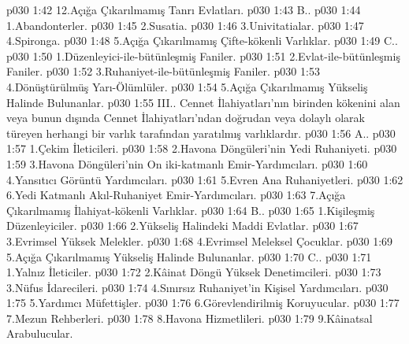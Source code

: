 \vs p030 1:42 12.\bibnobreakspace Açığa Çıkarılmamış Tanrı Evlatları.
\vs p030 1:43 B.\bibnobreakspace {}.
\vs p030 1:44 1.\bibnobreakspace Abandonterler.
\vs p030 1:45 2.\bibnobreakspace Susatia.
\vs p030 1:46 3.\bibnobreakspace Univitatialar.
\vs p030 1:47 4.\bibnobreakspace Spironga.
\vs p030 1:48 5.\bibnobreakspace Açığa Çıkarılmamış Çifte\hyp{}kökenli Varlıklar.
\vs p030 1:49 C.\bibnobreakspace {}.
\vs p030 1:50 1.\bibnobreakspace Düzenleyici\hyp{}ile\hyp{}bütünleşmiş Faniler.
\vs p030 1:51 2.\bibnobreakspace Evlat\hyp{}ile\hyp{}bütünleşmiş Faniler.
\vs p030 1:52 3.\bibnobreakspace Ruhaniyet\hyp{}ile\hyp{}bütünleşmiş Faniler.
\vs p030 1:53 4.\bibnobreakspace Dönüştürülmüş Yarı\hyp{}Ölümlüler.
\vs p030 1:54 5.\bibnobreakspace Açığa Çıkarılmamış Yükseliş Halinde Bulunanlar.
\vs p030 1:55 III.\bibnobreakspace {}. Cennet İlahiyatları’nın birinden kökenini alan veya bunun dışında Cennet İlahiyatları’ndan doğrudan veya dolaylı olarak türeyen herhangi bir varlık tarafından yaratılmış varlıklardır.
\vs p030 1:56 A.\bibnobreakspace {}.
\vs p030 1:57 1.\bibnobreakspace Çekim İleticileri.
\vs p030 1:58 2.\bibnobreakspace Havona Döngüleri’nin Yedi Ruhaniyeti.
\vs p030 1:59 3.\bibnobreakspace Havona Döngüleri’nin On iki\hyp{}katmanlı Emir\hyp{}Yardımcıları.
\vs p030 1:60 4.\bibnobreakspace Yansıtıcı Görüntü Yardımcıları.
\vs p030 1:61 5.\bibnobreakspace Evren Ana Ruhaniyetleri.
\vs p030 1:62 6.Yedi Katmanlı Akıl\hyp{}Ruhaniyet Emir\hyp{}Yardımcıları.
\vs p030 1:63 7.\bibnobreakspace Açığa Çıkarılmamış İlahiyat\hyp{}kökenli Varlıklar.
\vs p030 1:64 B.\bibnobreakspace {}.
\vs p030 1:65 1.\bibnobreakspace Kişileşmiş Düzenleyiciler.
\vs p030 1:66 2.\bibnobreakspace Yükseliş Halindeki Maddi Evlatlar.
\vs p030 1:67 3.\bibnobreakspace Evrimsel Yüksek Melekler.
\vs p030 1:68 4.\bibnobreakspace Evrimsel Meleksel Çocuklar.
\vs p030 1:69 5.\bibnobreakspace Açığa Çıkarılmamış Yükseliş Halinde Bulunanlar.
\vs p030 1:70 C.\bibnobreakspace {}.
\vs p030 1:71 1.\bibnobreakspace Yalnız İleticiler.
\vs p030 1:72 2.\bibnobreakspace Kâinat Döngü Yüksek Denetimcileri.
\vs p030 1:73 3.\bibnobreakspace Nüfus İdarecileri.
\vs p030 1:74 4.\bibnobreakspace Sınırsız Ruhaniyet’in Kişisel Yardımcıları.
\vs p030 1:75 5.\bibnobreakspace Yardımcı Müfettişler.
\vs p030 1:76 6.\bibnobreakspace Görevlendirilmiş Koruyucular.
\vs p030 1:77 7.\bibnobreakspace Mezun Rehberleri.
\vs p030 1:78 8.\bibnobreakspace Havona Hizmetlileri.
\vs p030 1:79 9.\bibnobreakspace Kâinatsal Arabulucular.
